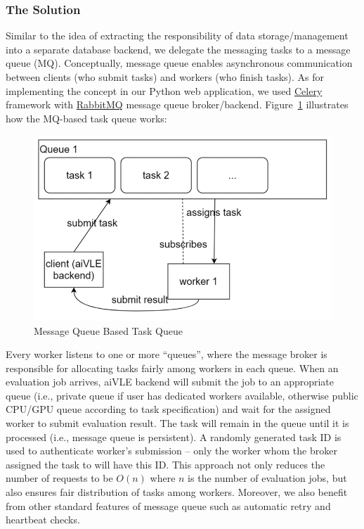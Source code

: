 \subsubsection{The Solution}
Similar to the idea of extracting the responsibility of data storage/management into a separate database backend, we delegate the messaging tasks to a message queue (MQ). Conceptually, message queue enables asynchronous communication between clients (who submit tasks) and workers (who finish tasks). As for implementing the concept in our Python web application, we used \href{https://docs.celeryq.dev/en/stable/}{Celery} framework with \href{https://www.rabbitmq.com/}{RabbitMQ} message queue broker/backend. Figure~\ref{fig:aivle-web-mq} illustrates how the MQ-based task queue works:

\begin{figure}[H]
    \centering
    \includegraphics{images/aivle-web-mq.png}
    \caption{Message Queue Based Task Queue}
    \label{fig:aivle-web-mq}
\end{figure}

Every worker listens to one or more ``queues'', where the message broker is responsible for allocating tasks fairly among workers in each queue. When an evaluation job arrives, aiVLE backend will submit the job to an appropriate queue (i.e., private queue if user has dedicated workers available, otherwise public CPU/GPU queue according to task specification) and wait for the assigned worker to submit evaluation result. The task will remain in the queue until it is processed (i.e., message queue is persistent). A randomly generated task ID is used to authenticate worker's submission – only the worker whom the broker assigned the task to will have this ID. This approach not only reduces the number of requests to be $O(n)$ where $n$ is the number of evaluation jobs, but also ensures fair distribution of tasks among workers. Moreover, we also benefit from other standard features of message queue such as automatic retry and heartbeat checks.

